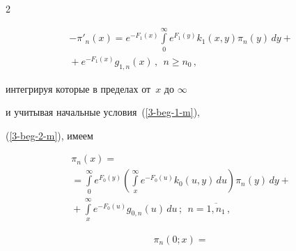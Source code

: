 \begin{multicols}{2}
\vspace*{-12pt}





\noindent


\begin{multline}


\label{pi-4-m}


-\pi'_n(x) = e^{-F_{1}(x)} \int\limits_0^\infty e^{F_{1}(y)} k_{1}(x,y)\pi_n(y)\, dy


+{}\\


{}+


e^{-F_{1}(x)} g_{1,n}(x) \,, \ \ n\ge n_0\,,


\end{multline}




интегрируя которые в пределах от~$x$ до $\infty$


и учитывая начальные условия~(\ref{3-beg-1-m}),


(\ref{3-beg-2-m}), имеем


\begin{multline}


\label{int-1-m}


\pi_n(x) ={}\\


{}= \int\limits_0^\infty e^{F_0(y)} \left(


\int\limits_x^\infty e^{-F_0(u)} k_0(u,y)\, du


\right) \pi_n(y)\, dy


+{}\\


{}+


\int\limits_x^\infty e^{-F_0(u)} g_{0,n}(u)\, du\,;


\ \ n=\overline{1,n_1}\,,


\end{multline}





\vspace*{-12pt}





\noindent


\begin{multline}


\label{int-2-m}


\pi_n(0;x) ={}\\



\end{multline}
\end{multicols}
